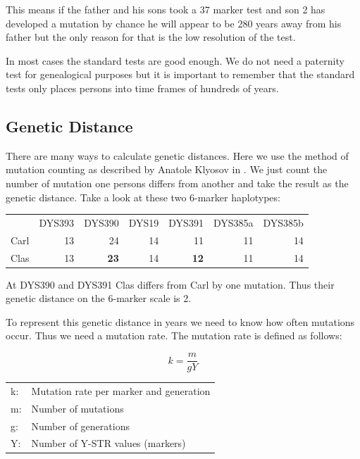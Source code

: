 This means if the father and his sons took a 37 marker test
and son 2 has developed a mutation by chance he will appear
to be 280 years away from his father but the only reason for
that is the low resolution of the test.

In most cases the standard tests are good enough. We do not
need a paternity test for genealogical purposes but it is
important to remember that the standard tests only places
persons into time frames of hundreds of years.


\subsection{Genetic Distance}

There are many ways to calculate genetic distances. Here we
use the method of mutation counting as described by Anatole
Klyosov in \cite{Kly09}.
We just count the number of mutation one persons differs from
another and take the result as the genetic distance.
Take a look at these two 6-marker haplotypes:

\vspace{1em}
\begin{tabular}{lrrrrrr}
       & DYS393 & DYS390      & DYS19 & DYS391      & DYS385a & DYS385b \\
Carl   &     13 & 24          & 14    & 11          & 11      & 14 \\
Clas   &     13 & \textbf{23} & 14    & \textbf{12} & 11      & 14
\end{tabular}
\vspace{1em}

At DYS390 and DYS391 Clas differs from Carl by one mutation.
Thus their genetic distance on the 6-marker scale is 2.

To represent this genetic distance in years we need to know
how often mutations occur. Thus we need a mutation rate.
The mutation rate is defined as follows:

\begin{equation}
k = \frac{m}{g Y} \label{mutationrate}
\end{equation}

\begin{tabular}{ll}
k: &  Mutation rate per marker and generation\\
m: &  Number of mutations \\
g: &  Number of generations \\
Y: &  Number of Y-STR values (markers)
\end{tabular}
\vspace{1em}

